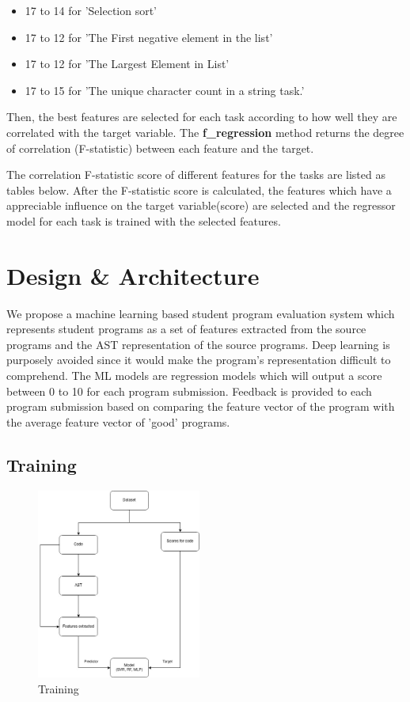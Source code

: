 \documentclass[conference]{IEEEtran}
\begin{document}
\begin{itemize}
    \item 17 to 14 for 'Selection sort'
    \item 17 to 12 for 'The First negative element in the list'
    \item 17 to 12 for 'The Largest Element in List'
    \item 17 to 15 for 'The unique character count in a string task.'
\end{itemize}

Then, the best features are selected for each task according to how well they are correlated with the target variable. The \textbf{f\_regression} method \cite{H} returns the degree of correlation (F-statistic) between each feature and the target. 

The correlation F-statistic score of different features for the tasks are listed as tables below. After the F-statistic score is calculated, the features which have a appreciable influence on the target variable(score) are selected and the regressor model for each task is trained with the selected features.

\section{Design \& Architecture}

We propose a machine learning based student program evaluation system which represents student programs as a set of features extracted from the source programs and the AST representation of the source programs. Deep learning is purposely avoided since it would make the program's representation difficult to comprehend. The ML models are regression models which will output a score between 0 to 10 for each program submission. Feedback is provided to each program submission based on comparing the feature vector of the program with the average feature vector of 'good' programs.


\subsection{Training} 

\begin{figure}[h]
\centering
\includegraphics[width=0.48\textwidth]{./training.jpg}
\caption{Training}
\label{fig1}
\end{figure}
\end{document}

